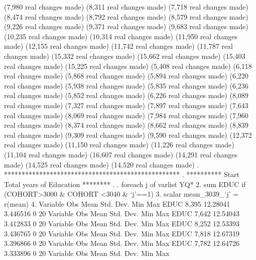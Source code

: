 (7,980 real changes made)
(8,311 real changes made)
(7,718 real changes made)
(8,474 real changes made)
(8,792 real changes made)
(8,579 real changes made)
(9,226 real changes made)
(9,371 real changes made)
(9,683 real changes made)
(10,235 real changes made)
(10,314 real changes made)
(11,950 real changes made)
(12,155 real changes made)
(11,742 real changes made)
(11,787 real changes made)
(15,332 real changes made)
(15,662 real changes made)
(15,403 real changes made)
(15,225 real changes made)
(5,408 real changes made)
(6,118 real changes made)
(5,868 real changes made)
(5,894 real changes made)
(6,220 real changes made)
(5,938 real changes made)
(5,835 real changes made)
(6,236 real changes made)
(5,852 real changes made)
(6,226 real changes made)
(8,089 real changes made)
(7,327 real changes made)
(7,897 real changes made)
(7,643 real changes made)
(8,069 real changes made)
(7,984 real changes made)
(7,960 real changes made)
(8,374 real changes made)
(8,662 real changes made)
(8,839 real changes made)
(9,309 real changes made)
(9,590 real changes made)
(12,372 real changes made)
(11,150 real changes made)
(11,226 real changes made)
(11,104 real changes made)
(16,607 real changes made)
(14,291 real changes made)
(14,525 real changes made)
(14,520 real changes made)
{\smallskip}
. **************************************************
. **********  Start Total years of Education ********
. 
. foreach j of varlist YQ* {\lbr}
  2.                 sum EDUC if (COHORT>3000 \& COHORT <3040 \& `j'==1)
  3.                 scalar mean_3039_`j' = r(mean)
  4. {\rbr}       
{\smallskip}
    Variable {\VBAR}        Obs        Mean    Std. Dev.       Min        Max
        EDUC {\VBAR}      8,395    12.28041    3.446516          0         20
{\smallskip}
    Variable {\VBAR}        Obs        Mean    Std. Dev.       Min        Max
        EDUC {\VBAR}      7,642    12.54043    3.412833          0         20
{\smallskip}
    Variable {\VBAR}        Obs        Mean    Std. Dev.       Min        Max
        EDUC {\VBAR}      8,252    12.53393    3.436765          0         20
{\smallskip}
    Variable {\VBAR}        Obs        Mean    Std. Dev.       Min        Max
        EDUC {\VBAR}      7,818    12.67319    3.396866          0         20
{\smallskip}
    Variable {\VBAR}        Obs        Mean    Std. Dev.       Min        Max
        EDUC {\VBAR}      7,782    12.64726    3.333896          0         20
{\smallskip}
    Variable {\VBAR}        Obs        Mean    Std. Dev.       Min        Max

